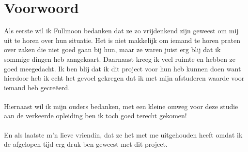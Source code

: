 \chapter*{Voorwoord} 

Als eerste wil ik Fullmoon bedanken dat ze zo vrijdenkend zijn geweest om mij uit te horen over hun situatie. Het is niet makkelijk om iemand te horen praten over zaken die niet goed gaan bij hun, maar ze waren juist erg blij dat ik sommige dingen heb aangekaart. Daarnaast kreeg ik veel ruimte en hebben ze goed meegedacht. Ik ben blij dat ik dit project voor hun heb kunnen doen want hierdoor heb ik echt het gevoel gekregen dat ik met mijn afstuderen waarde voor iemand heb gecre\"{e}erd.
\\\\
Hiernaast wil ik mijn ouders bedanken, met een kleine omweg voor deze studie aan de verkeerde opleiding ben ik toch goed terecht gekomen!
\\\\
En als laatste m'n lieve vriendin, dat ze het met me uitgehouden heeft omdat ik de afgelopen tijd erg druk ben geweest met dit project.